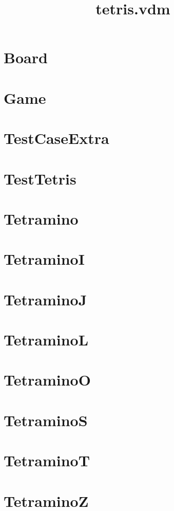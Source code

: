 \documentclass{article}
\begin{document}
\title{tetris.vdm}
\author{}
\maketitle
\tableofcontents

\section{Board}

\section{Game}

\section{TestCaseExtra}

\section{TestTetris}

\section{Tetramino}

\section{TetraminoI}

\section{TetraminoJ}

\section{TetraminoL}

\section{TetraminoO}

\section{TetraminoS}

\section{TetraminoT}

\section{TetraminoZ}

\end{document}
